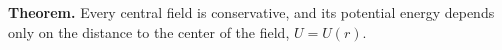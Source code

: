 \textbf{Theorem.} Every central field is conservative, and its potential energy depends only on the distance to the center of the field, $U = U(r)$.
